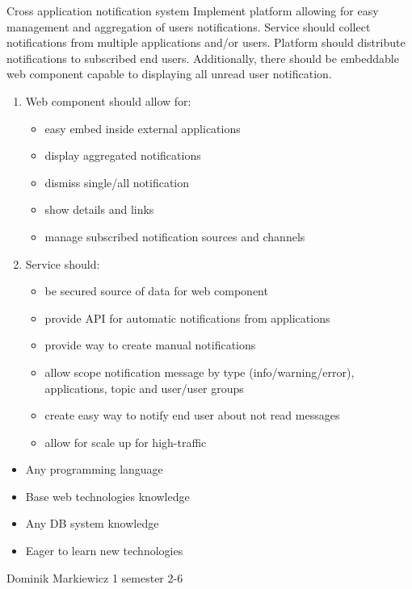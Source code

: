 \begin{project}
{Cross application notification system}
{Implement platform allowing for easy management and aggregation of users notifications. Service should collect notifications from multiple applications and/or users. Platform should distribute notifications to subscribed end users. Additionally, there should be embeddable web component capable to displaying all unread user notification.} 
{
\begin{enumerate}
	\item Web component should allow for:
		\begin{itemize}
			\item easy embed inside external applications
			\item display aggregated notifications
			\item dismiss single/all notification
			\item show details and links
			\item manage subscribed notification sources and channels
		\end{itemize}
	\item Service should:
		\begin{itemize}
			\item be secured source of data for web component
			\item provide API for automatic notifications from applications
			\item provide way to create manual notifications
			\item allow scope notification message by type (info/warning/error), applications, topic and user/user groups
			\item create easy way to notify end user about not read messages
			\item allow for scale up for high-traffic
		\end{itemize}
\end{enumerate}
}
{
\begin{itemize}
	\item Any programming language
	\item Base web technologies knowledge
	\item Any DB system knowledge
	\item Eager to learn new technologies
\end{itemize}
}
{Dominik Markiewicz}
{1 semester}
{2-6}
\end{project}
